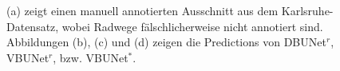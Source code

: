 \begin{figure}
	\caption{(a) zeigt einen manuell annotierten Ausschnitt aus dem Karlsruhe-Datensatz, wobei Radwege 
	fälschlicherweise nicht annotiert sind. Abbildungen (b), (c) und (d) zeigen die Predictions von \ac{DBUNet}$^r$,
	\ac{VBUNet}$^r$, bzw. \ac{VBUNet}$^*$.}
	\label{fig:annotation-mistake}
\end{figure}













